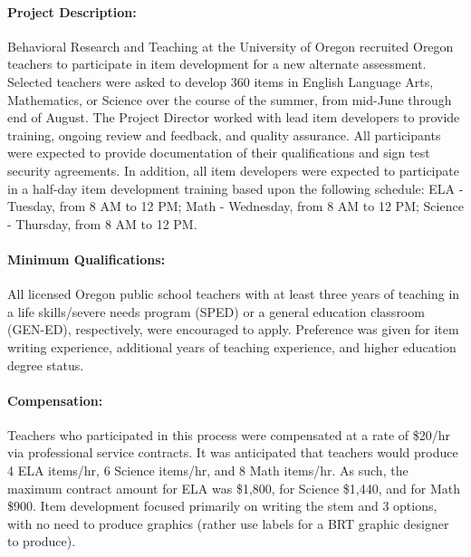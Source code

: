 \documentclass[]{article}
\let\oldparagraph\paragraph
\renewcommand{\paragraph}[1]{\oldparagraph{#1}\mbox{}}
\begin{document}
\hypertarget{project-description}{%
\paragraph{Project Description:}\label{project-description}}

Behavioral Research and Teaching at the University of Oregon recruited
Oregon teachers to participate in item development for a new alternate
assessment. Selected teachers were asked to develop 360 items in English
Language Arts, Mathematics, or Science over the course of the summer,
from mid-June through end of August. The Project Director worked with
lead item developers to provide training, ongoing review and feedback,
and quality assurance. All participants were expected to provide
documentation of their qualifications and sign test security agreements.
In addition, all item developers were expected to participate in a
half-day item development training based upon the following schedule:
ELA - Tuesday, from 8 AM to 12 PM; Math - Wednesday, from 8 AM to 12 PM;
Science - Thursday, from 8 AM to 12 PM.

\hypertarget{minimum-qualifications}{%
\paragraph{Minimum Qualifications:}\label{minimum-qualifications}}

All licensed Oregon public school teachers with at least three years of
teaching in a life skills/severe needs program (SPED) or a general
education classroom (GEN-ED), respectively, were encouraged to apply.
Preference was given for item writing experience, additional years of
teaching experience, and higher education degree status.

\hypertarget{compensation}{%
\paragraph{Compensation:}\label{compensation}}

Teachers who participated in this process were compensated at a rate of
\$20/hr via professional service contracts. It was anticipated that
teachers would produce 4 ELA items/hr, 6 Science items/hr, and 8 Math
items/hr. As such, the maximum contract amount for ELA was \$1,800, for
Science \$1,440, and for Math \$900. Item development focused primarily
on writing the stem and 3 options, with no need to produce graphics
(rather use labels for a BRT graphic designer to produce).
\end{document}
